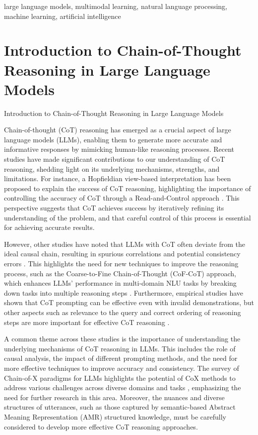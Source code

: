 \documentclass[conference]{IEEEtran}
\begin{document}
\begin{IEEEkeywords}
large language models, multimodal learning, natural language processing, machine learning, artificial intelligence
\end{IEEEkeywords}


\section{Introduction to Chain-of-Thought Reasoning in Large Language Models}
Introduction to Chain-of-Thought Reasoning in Large Language Models

Chain-of-thought (CoT) reasoning has emerged as a crucial aspect of large language models (LLMs), enabling them to generate more accurate and informative responses by mimicking human-like reasoning processes. Recent studies have made significant contributions to our understanding of CoT reasoning, shedding light on its underlying mechanisms, strengths, and limitations. For instance, a Hopfieldian view-based interpretation has been proposed to explain the success of CoT reasoning, highlighting the importance of controlling the accuracy of CoT through a Read-and-Control approach \cite{b1}. This perspective suggests that CoT achieves success by iteratively refining its understanding of the problem, and that careful control of this process is essential for achieving accurate results.

However, other studies have noted that LLMs with CoT often deviate from the ideal causal chain, resulting in spurious correlations and potential consistency errors \cite{b2}. This highlights the need for new techniques to improve the reasoning process, such as the Coarse-to-Fine Chain-of-Thought (CoF-CoT) approach, which enhances LLMs' performance in multi-domain NLU tasks by breaking down tasks into multiple reasoning steps \cite{b4}. Furthermore, empirical studies have shown that CoT prompting can be effective even with invalid demonstrations, but other aspects such as relevance to the query and correct ordering of reasoning steps are more important for effective CoT reasoning \cite{b3}.

A common theme across these studies is the importance of understanding the underlying mechanisms of CoT reasoning in LLMs. This includes the role of causal analysis, the impact of different prompting methods, and the need for more effective techniques to improve accuracy and consistency. The survey of Chain-of-X paradigms for LLMs highlights the potential of CoX methods to address various challenges across diverse domains and tasks \cite{b5}, emphasizing the need for further research in this area. Moreover, the nuances and diverse structures of utterances, such as those captured by semantic-based Abstract Meaning Representation (AMR) structured knowledge, must be carefully considered to develop more effective CoT reasoning approaches.
\end{document}
